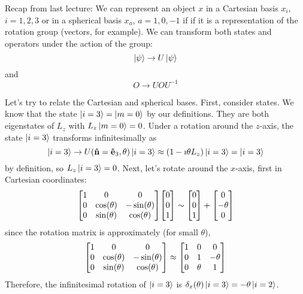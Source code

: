 \documentclass[a4paper,twoside,master.tex]{subfiles}
\begin{document}

Recap from last lecture: We can represent an object $ x $ in a Cartesian basis $ x_i $, $ i = 1,2,3 $ or in a spherical basis $ x_a $, $ a = 1,0,-1 $ if if it is a representation of the rotation group (vectors, for example). We can transform both states and operators under the action of the group:
\begin{equation}
    \ket{\psi} \to U\ket{\psi}
\end{equation}
and
\begin{equation}
    O \to U O U^{-1}
\end{equation}

Let's try to relate the Cartesian and spherical bases. First, consider states. We know that the state $\ket{i=3} =\ket{m=0} $ by our definitions. They are both eigenstates of $ L_z $ with $ L_z\ket{m=0} = 0 $. Under a rotation around the $ z $-axis, the state $\ket{i=3} $ transforms infinitesimally as
\begin{equation}
    \ket{i=3} \to U(\vu{n} = \vu{e}_3, \theta)\ket{i=3} \approx (1- \imath \theta L_z)\ket{i=3} =\ket{i=3}
\end{equation}
by definition, so $ L_z\ket{i=3} = 0 $. Next, let's rotate around the $ x $-axis, first in Cartesian coordinates:
\begin{equation}
    \mqty[1&0&0\\0& \cos(\theta) & - \sin(\theta) \\0& \sin(\theta) & \cos(\theta)] \mqty[0\\0\\1] \sim \mqty[0\\0\\1] + \mqty[0\\- \theta \\0]
\end{equation}
since the rotation matrix is approximately (for small $ \theta $),
\begin{equation}
    \mqty[1&0&0\\0& \cos(\theta) & - \sin(\theta) \\0& \sin(\theta) & \cos(\theta)] \approx  \mqty[1&0&0\\0&1&- \theta \\0& \theta &1]
\end{equation}
Therefore, the infinitesimal rotation of $\ket{i=3} $ is $ \delta_x(\theta)\ket{i=3} = - \theta\ket{i=2} $.
\end{document}

